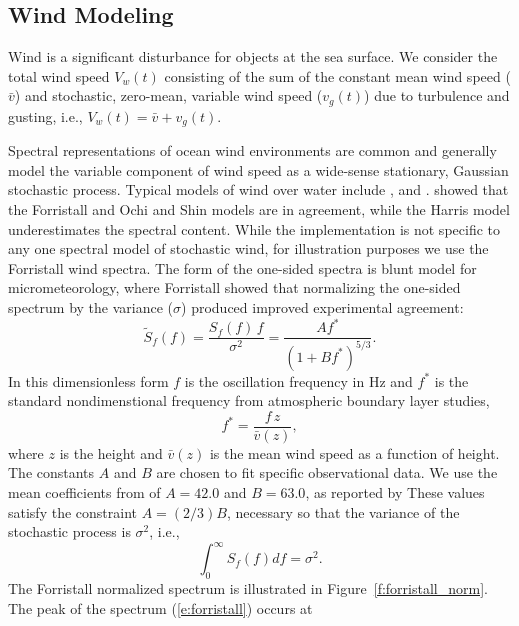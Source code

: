 \documentclass[utf8]{frontiersSCNS} %
\begin{document}
\subsection{Wind Modeling}\label{s:wind_model}
Wind is a significant disturbance for objects at the sea surface. We consider the total wind speed $V_w(t)$ consisting of the sum of the constant mean wind speed ($\bar{v}$) and stochastic, zero-mean, variable wind speed ($v_g(t)$) due to turbulence and gusting, i.e., $V_w(t)=\bar{v}+v_g(t)$.

Spectral representations of ocean wind environments are common and generally model the variable component of wind speed as a wide-sense stationary, Gaussian stochastic process.  Typical models of wind over water include \citet{harris71nature}, \citet{forristall88wind} and \citet{ochi13wind}. \citet{cole18reactive} showed that the Forristall and Ochi and Shin models are in agreement, while the Harris model underestimates the spectral content.  While the implementation is not specific to any one spectral model of stochastic wind, for illustration purposes we use the Forristall wind spectra.  The form of the one-sided spectra is \citet{olesen84modelling} blunt model for micrometeorology, where Forristall showed that normalizing the one-sided spectrum by the variance ($\sigma$) produced improved experimental agreement:
\begin{equation}
  \widetilde{S}_f(f) = \frac{S_f(f)\,f}{\sigma^2}  = \frac{ A f^*}{( 1 + B f^*)^{5/3}}.
    \label{e:forristall}
    \end{equation}
    In this dimensionless form $f$ is the oscillation frequency in \unit[]{Hz} and $f^*$ is the standard nondimenstional frequency from atmospheric boundary layer studies,
\begin{equation}
  f^* = \frac{f \, z}{\bar{v}(z)},
\end{equation}
where $z$ is the height and $\bar{v}(z)$ is the mean wind speed as a function of height. The constants $A$ and $B$ are chosen to fit specific observational data.  We use the mean coefficients from of $A=42.0$ and $B=63.0$, as reported by \citet{forristall88wind}  These values satisfy the constraint $A=(2/3)B$, necessary so that the variance of the stochastic process is $\sigma^2$, i.e.,
\begin{equation}
  \int_0^{\infty} S_f(f) df = \sigma^2.
\end{equation}
The Forristall normalized spectrum is illustrated in Figure~\ref{f:forristall_norm}.   The peak of the spectrum (\ref{e:forristall}) occurs at
\end{document}
